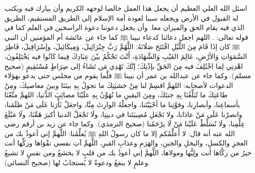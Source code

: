 اسئل الله العلي العظيم أن يجعل هذا العمل خالصا لوجهه الكريم وأن يبارك فيه ويكتب له القبول في الأرض ويجعله سببا لعودة أمة الإسلام إلى الطريق المستقيم، الطريق الذي فيه يقام الحق والميزان معا. وأن يجعل دعوتنا دعوة الراسخين في العلم كما في قوله تعالى: \quranayah*[3][7][32]\quranayah*[3][8-9]{\footnotesize \surahname*[3]}. اللهم اجعل دعائنا كدعاء نبينا ﷺ كما جاء عن عائشة أم المؤمنين أن النبي ﷺ كان إذَا قَامَ مِنَ اللَّيْلِ افْتَتَحَ صَلَاتَهُ: اللَّهُمَّ رَبَّ جِبْرَائِيلَ، وَمِيكَائِيلَ، وإسْرَافِيلَ، فَاطِرَ السَّمَوَاتِ وَالأرْضِ، عَالِمَ الغَيْبِ وَالشَّهَادَةِ، أَنْتَ تَحْكُمُ بيْنَ عِبَادِكَ فِيما كَانُوا فيه يَخْتَلِفُونَ، اهْدِنِي لِما اخْتُلِفَ فيه مِنَ الحَقِّ بإذْنِكَ؛ إنَّكَ تَهْدِي مَن تَشَاءُ إلى صِرَاطٍ مُسْتَقِيمٍ {\footnotesize (صحيح مسلم)}. وكما جاء عن عبدالله بن عمر أن نبينا ﷺ قلَّما يقوم من مجلس حتى يدعو بهؤلاء الدعوات لأصحابه: اللهمَّ اقسِمْ لنا مِنْ خشيَتِكَ ما تحولُ بِهِ بينَنَا وبينَ معاصيكَ، ومِنْ طاعَتِكَ ما تُبَلِّغُنَا بِهِ جنتَكَ، ومِنَ اليقينِ ما تُهَوِّنُ بِهِ علَيْنَا مصائِبَ الدُّنيا، اللهمَّ متِّعْنَا بأسماعِنا، وأبصارِنا، وقوَّتِنا ما أحْيَيْتَنا، واجعلْهُ الوارِثَ مِنَّا، واجعَلْ ثَأْرَنا عَلَى مَنْ ظلَمَنا، وانصرْنا عَلَى مَنْ عادَانا، ولا تَجْعَلِ مُصِيبَتَنا في دينِنِا، ولَا تَجْعَلْ الدنيا أكبرَ هَمِّنَا، ولَا مَبْلَغَ عِلْمِنا، ولَا تُسَلِّطْ عَلَيْنا مَنْ لَا يرْحَمُنا {\footnotesize (صحيح الترمذي)}. وكما جاء عن زيد بن أرقم رضي الله عنه أنه قال: لا أُعلِّمُكم إلا ما كان رسولُ اللهِ ﷺ يُعلِّمُنا: اللَّهمَّ إني أعوذُ بك من العجزِ والكسلِ، والبخلِ والجبنِ، والهَرَمِ وعذابِ القبرِ، اللَّهمَّ آتِ نفسي تقْوَاها وزكِّها أنت خيرُ من زكَّاها أنت ولِيُّها ومولاها، اللَّهمَّ إني أعوذُ بك من قلبٍ لا يخشعُ ومن نفسٍ لا تشبعُ وعلمٍ لا ينفعُ ودعوةٌ لا يُستجابُ لها {\footnotesize (صحيح النسائي)}.

\vskip 0.5in

